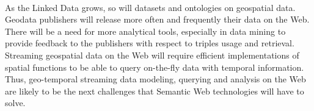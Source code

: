 \documentclass[a4paper,11pt,twoside]{report}
\begin{document}
\paragraph{}
As the Linked Data grows, so will datasets and ontologies on geospatial data. Geodata publishers will release more often and frequently their data on the Web. There will be a need for more analytical tools, especially in data mining to provide feedback to the publishers with respect to triples usage and retrieval. Streaming geospatial data on the Web will require efficient implementations of spatial functions to be able to query on-the-fly data with temporal information. Thus, geo-temporal streaming data modeling, querying and analysis on the Web are likely to be the next challenges that Semantic Web technologies will have to solve.  
\end{document}
